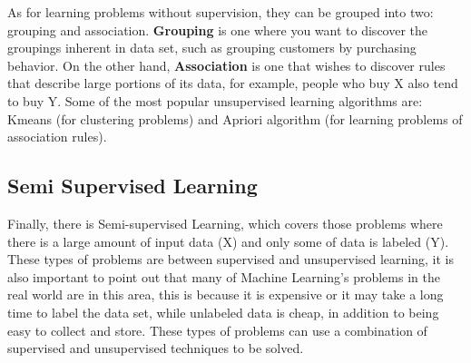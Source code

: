 As for learning problems without supervision, they can be grouped into two: grouping and association. \textbf{Grouping} is one where you want to discover the groupings inherent in data set, such as grouping customers by purchasing behavior. On the other hand,  \textbf{Association} is one that wishes to discover rules that describe large portions of its data, for example, people who buy X also tend to buy Y. Some of the most popular unsupervised learning algorithms are: Kmeans (for clustering problems) and Apriori algorithm (for learning problems of association rules).

\subsection{Semi Supervised Learning}

Finally, there is Semi-supervised Learning, which covers those problems where there is a large amount of input data (X) and only some of data is labeled (Y). These types of problems are between supervised and unsupervised learning, it is also important to point out that many of Machine Learning's problems in the real world are in this area, this is because it is expensive or it may take a long time to label the data set, while unlabeled data is cheap, in addition to being easy to collect and store. These types of problems can use a combination of supervised and unsupervised techniques to be solved.

